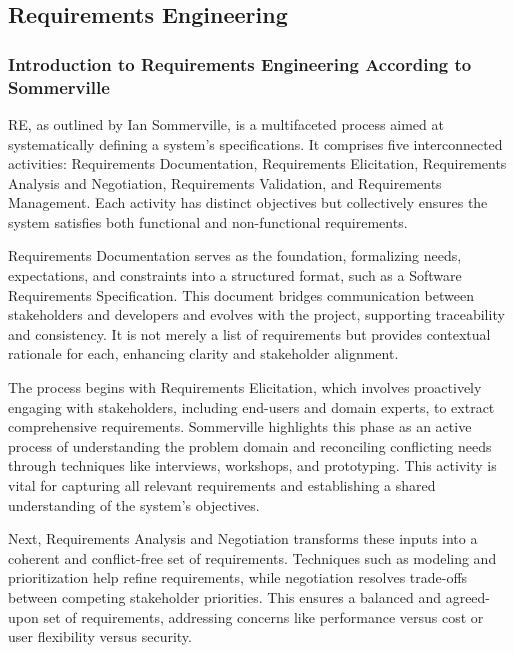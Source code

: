 \subsection{Requirements Engineering}\label{subsec:requirements-engineering}

\subsubsection{Introduction to Requirements Engineering According to Sommerville}

\ac{RE}, as outlined by Ian Sommerville, is a multifaceted process aimed at systematically defining a
system’s specifications. \autocite[cf.][p.5]{sommervilleRequirementsEngineeringGood1997} It comprises five
interconnected activities: Requirements Documentation, Requirements Elicitation, Requirements Analysis and Negotiation,
Requirements Validation, and Requirements Management.\autocite[cf.][p.11]{sommervilleRequirementsEngineeringGood1997}
Each activity has distinct objectives but collectively ensures the system satisfies both functional and non-functional
requirements.\autocite[cf.][p.7--8]{sommervilleRequirementsEngineeringGood1997}

Requirements Documentation serves as the foundation, formalizing needs, expectations, and constraints into a structured
format, such as a Software Requirements Specification. This document bridges communication between stakeholders
and developers and evolves with the project, supporting traceability and consistency. It is not merely a list of
requirements but provides contextual rationale for each, enhancing clarity and stakeholder alignment.
\autocite[cf.][38--40]{sommervilleRequirementsEngineeringGood1997}

The process begins with Requirements Elicitation, which involves proactively engaging with stakeholders, including
end-users and domain experts, to extract comprehensive requirements. Sommerville highlights this phase as an active
process of understanding the problem domain and reconciling conflicting needs through techniques like interviews,
workshops, and prototyping. This activity is vital for capturing all relevant requirements and establishing a shared
understanding of the system’s objectives.\autocite[cf.][p.64--65]{sommervilleRequirementsEngineeringGood1997}

Next, Requirements Analysis and Negotiation transforms these inputs into a coherent and conflict-free set of
requirements. Techniques such as modeling and prioritization help refine requirements, while negotiation resolves
trade-offs between competing stakeholder priorities. This ensures a balanced and agreed-upon set of requirements,
addressing concerns like performance versus cost or user flexibility versus security.
\autocite[cf.][p.112--113]{sommervilleRequirementsEngineeringGood1997}

